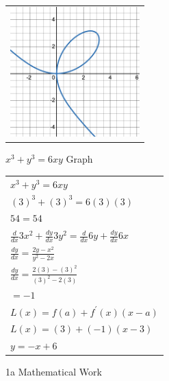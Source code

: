 \documentclass[answers,addpoints]{exam}
\begin{document}

\begin{questions}
  \question \
  \begin{solution}

    \begin{figure}[H]
      \centering
      \begin{tabular}{@{}l@{}}
        \includegraphics[width=5cm]{desmos-graph.png}
      \end{tabular}
      \caption{$x^3+y^3=6xy$ Graph}
      \label{fig:graph}
    \end{figure}

    \begin{figure}[H]
      \centering
      \begin{tabular}{@{}l@{}}
        $\displaystyle x^3+y^3=6xy$ \\[6pt]
        $\displaystyle (3)^3+(3)^3=6(3)(3)$ \\[6pt]
        $\displaystyle 54=54$ \\[12pt]
        $\displaystyle \frac{d}{dx}3x^2+\frac{dy}{dx}3y^2=\frac{d}{dx}6y+\frac{dy}{dx}6x$ \\[6pt]
        $\displaystyle \frac{dy}{dx}=\frac{2y-x^2}{y^2-2x}$ \\[6pt]
        $\displaystyle \frac{dy}{dx}=\frac{2(3)-(3)^2}{(3)^2-2(3)}$ \\[6pt]
        $\displaystyle =-1$ \\[12pt]
        $\displaystyle L(x)=f(a)+f^\prime(x)(x-a)$ \\[6pt]
        $\displaystyle L(x)=(3)+(-1)(x-3)$ \\[6pt]
        $\displaystyle y=-x+6$ \\
      \end{tabular}
      \caption{1a Mathematical Work}
      \label{fig:1a-math}
    \end{figure}


\end{solution}
\end{questions}
\end{document}
